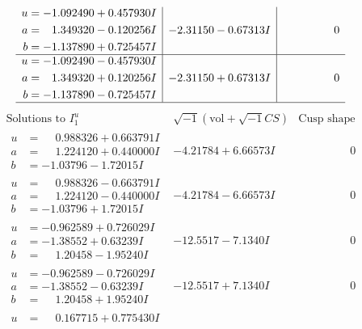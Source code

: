 \documentclass[1p]{elsarticle_modified}
\theoremstyle{definition}
\newcommand{\I}{\sqrt{-1}}
\begin{document}
$$\begin{array}{c|c|c}
\begin{aligned}
u &= -1.092490 + 0.457930 I \\
a &= \phantom{-}1.349320 - 0.120256 I \\
b &= -1.137890 + 0.725457 I\end{aligned}
 & -2.31150 - 0.67313 I & \phantom{-0.000000 } 0 \\ \hline\begin{aligned}
u &= -1.092490 - 0.457930 I \\
a &= \phantom{-}1.349320 + 0.120256 I \\
b &= -1.137890 - 0.725457 I\end{aligned}
 & -2.31150 + 0.67313 I & \phantom{-0.000000 } 0\\
 \hline 
 \end{array}$$\newpage$$\begin{array}{c|c|c}  
\text{Solutions to }I^u_{1}& \I (\text{vol} + \sqrt{-1}CS) & \text{Cusp shape}\\
 \hline 
\begin{aligned}
u &= \phantom{-}0.988326 + 0.663791 I \\
a &= \phantom{-}1.224120 + 0.440000 I \\
b &= -1.03796 - 1.72015 I\end{aligned}
 & -4.21784 + 6.66573 I & \phantom{-0.000000 } 0 \\ \hline\begin{aligned}
u &= \phantom{-}0.988326 - 0.663791 I \\
a &= \phantom{-}1.224120 - 0.440000 I \\
b &= -1.03796 + 1.72015 I\end{aligned}
 & -4.21784 - 6.66573 I & \phantom{-0.000000 } 0 \\ \hline\begin{aligned}
u &= -0.962589 + 0.726029 I \\
a &= -1.38552 + 0.63239 I \\
b &= \phantom{-}1.20458 - 1.95240 I\end{aligned}
 & -12.5517 - 7.1340 I & \phantom{-0.000000 } 0 \\ \hline\begin{aligned}
u &= -0.962589 - 0.726029 I \\
a &= -1.38552 - 0.63239 I \\
b &= \phantom{-}1.20458 + 1.95240 I\end{aligned}
 & -12.5517 + 7.1340 I & \phantom{-0.000000 } 0 \\ \hline\begin{aligned}
u &= \phantom{-}0.167715 + 0.775430 I \\

\end{aligned}
\end{array}$$
\end{document}
